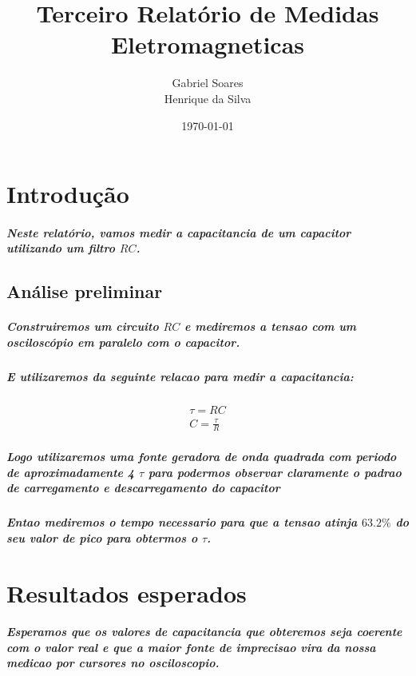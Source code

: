 \documentclass[12pt,twoside, a4paper, twocolumn]{article}
\title{Terceiro Relatório de Medidas Eletromagneticas}
\author{Gabriel Soares \\ Henrique da Silva}
\date{\today}
\begin{document}
\maketitle
{}
\newpage
\tableofcontents
\newpage



\section{Introdução}


\subparagraph*{Neste relatório, vamos medir a capacitancia de um capacitor utilizando um filtro $RC$.}





\subsection{Análise preliminar}

\subparagraph*{Construiremos um circuito $RC$ e mediremos a tensao com um osciloscópio em paralelo com o capacitor.}

\subparagraph*{E utilizaremos da seguinte relacao para medir a capacitancia:}

\begin{equation}
    \begin{aligned}
        \tau = RC \\
        C = \frac{\tau}{R}
    \end{aligned}
\end{equation}

\subparagraph*{Logo utilizaremos uma fonte geradora de onda quadrada com periodo de aproximadamente 4 $\tau$ para podermos observar claramente o padrao de carregamento e descarregamento do capacitor}

\subparagraph*{Entao mediremos o tempo necessario para que a tensao atinja $63.2\%$ do seu valor de pico para obtermos o $\tau$.}

\section{Resultados esperados}

\subparagraph*{Esperamos que os valores de capacitancia que obteremos seja coerente com o valor real e que a maior fonte de imprecisao vira da nossa medicao por cursores no osciloscopio.}
\end{document}
